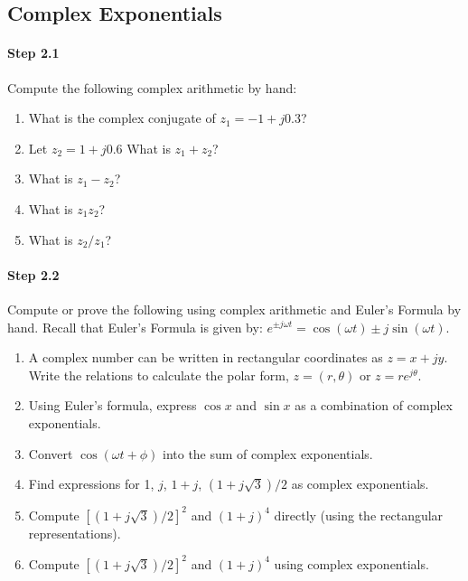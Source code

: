 \subsection{Complex Exponentials}

\paragraph{Step 2.1} Compute the following complex arithmetic by hand:
\begin{enumerate}\renewcommand{\theenumi}{\alph{enumi}}
\item What is the complex conjugate of $z_1 = -1 + j 0.3$?

\item Let $z_2 = 1 + j 0.6$ What is $z_1 + z_2$?

\item What is $z_1 - z_2$?

\item What is $z_1 z_2$?

\item What is $z_2/z_1$?

\end{enumerate}

\paragraph{Step 2.2} Compute or prove the following using complex arithmetic and Euler's Formula by hand. Recall that Euler's Formula is given by: $e^{\pm j\omega t}=\cos(\omega t) \pm j \sin(\omega t)$.

\begin{enumerate}
\item A complex number can be written in rectangular coordinates as $z
  = x + j y$. Write the relations to calculate the polar form, $z=(r,
  \theta)$ or $z = r e^{j\theta}$.

\item Using Euler's formula, express $\cos x$ and $\sin x$ as a
  combination of complex exponentials.
  
\item Convert $\cos(\omega t+\phi)$ into the sum of complex exponentials.  

\item Find expressions for 1, $j$, $1 + j$, $(1 + j\sqrt{3})/2$ as
  complex exponentials.

\item Compute $[(1+j\sqrt{3})/2]^2$ and $(1+j)^4$ directly (using the
  rectangular representations).
  
\item Compute $[(1+j\sqrt{3})/2]^2$ and $(1+j)^4$ using complex
  exponentials.
  
\end{enumerate}


